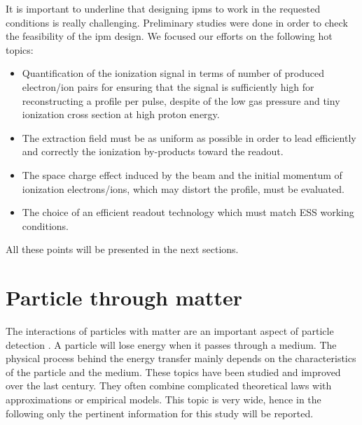\begin{refsection}
  It is important to underline that designing \acrshort{ipm}s to work in the requested conditions is really challenging. Preliminary studies were done in order to check the feasibility of the \acrshort{ipm} design. We focused our efforts on the following hot topics:
  \begin{itemize}
    \item Quantification of the ionization signal in terms of number of produced electron/ion pairs for ensuring that the signal is sufficiently high for reconstructing a profile per pulse, despite of the low gas pressure and tiny ionization cross section at high proton energy.
    \item The extraction field must be as uniform as possible in order to lead efficiently and correctly the ionization by-products toward the readout. %
    \item The space charge effect induced by the beam and the initial momentum of ionization electrons/ions, which may distort the profile, must be evaluated.
    \item The choice of an efficient readout technology which must match ESS working conditions.
  \end{itemize}
  All these points will be presented in the next sections.


  \section{Particle through matter}
  \label{chap3:sec_particle_in_matter}
  The interactions of particles with matter are an important aspect of particle detection \cite{Knoll2010,Leo1994}. A particle will lose energy when it passes through a medium. The physical process behind the energy transfer mainly depends on the characteristics of the particle and the medium. These topics have been studied and improved over the last century. They often combine complicated theoretical laws with approximations or empirical models. This topic is very wide, hence in the following only the pertinent information for this study will be reported.


\end{refsection}
